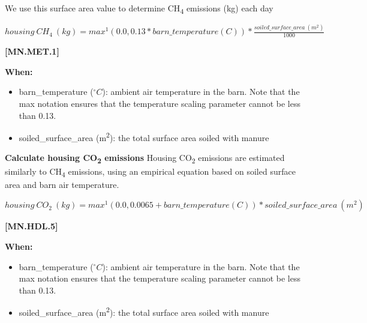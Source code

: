 \begin{refsection}
We use this surface area value to determine CH\textsubscript{4} emissions (kg) each day
\vspace{0.2cm}

    \begin{center}
        \(housing\ CH_{4}\ (kg) = max^1(0.0, 0.13 * barn\_temperature (C)) * \frac{soiled\_surface\_area\ (m^2)}{1000}
 \)
    \end{center}
        \vspace{0.5cm}
    
            {\raggedleft \textbf{[MN.MET.1]}\par}
            \vspace{0.5cm}

\textbf{When:}
    \begin{itemize}
        \item barn\_temperature (\(^\circ C\)): ambient air temperature in the barn. Note that the max notation ensures that the temperature scaling parameter cannot be less than 0.13.
        \item soiled\_surface\_area (m\textsuperscript{2}): the total surface area soiled with manure
    \end{itemize}  


\textbf{Calculate housing CO\textsubscript{2} emissions}
Housing CO\textsubscript{2} emissions are estimated similarly to CH\textsubscript{4} emissions, using an empirical equation based on soiled surface area and barn air temperature.
\vspace{0.2cm}

    \begin{center}
        \(housing\ CO_{2}\ (kg) = max^1(0.0, 0.0065 + barn\_temperature (C)) * soiled\_surface\_area\ (m^2)
 \)
    \end{center}
        \vspace{0.5cm}
    
            {\raggedleft \textbf{[MN.HDL.5]}\par}
            \vspace{0.5cm}

\textbf{When:}
    \begin{itemize}
        \item barn\_temperature (\(^\circ C\)): ambient air temperature in the barn. Note that the max notation ensures that the temperature scaling parameter cannot be less than 0.13.
        \item soiled\_surface\_area (m\textsuperscript{2}): the total surface area soiled with manure
    \end{itemize}  
            

\end{refsection}
